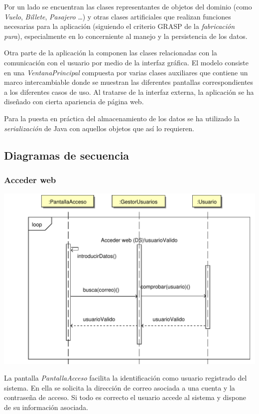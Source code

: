 \documentclass[11pt, a4paper, twoside, titlepage]{article}
\begin{document}
			Por un lado se encuentran las clases representantes de objetos del dominio (como \textit{Vuelo}, \textit{Billete}, \textit{Pasajero} \ldots) y otras clases artificiales que realizan funciones necesarias para la aplicación (siguiendo el criterio GRASP de la \textit{fabricación pura}), especialmente en lo concerniente al manejo y la persistencia de los datos.

			Otra parte de la aplicación la componen las clases relacionadas con la comunicación con el usuario por medio de la interfaz gráfica. El modelo consiste en una \textit{VentanaPrincipal} compuesta por varias clases auxiliares que contiene un marco intercambiable donde se muestran las diferentes pantallas correspondientes a los diferentes casos de uso. Al tratarse de la interfaz externa, la aplicación se ha diseñado con cierta apariencia de página web.

			Para la puesta en práctica del almacenamiento de los datos se ha utilizado la \textit{serialización} de Java con aquellos objetos que así lo requieren.

		\subsection{Diagramas de secuencia}
			\subsubsection{Acceder web}
				\begin{center}
					\includegraphics[scale=.7]{diseno/diagramas/accederweb.pdf}
				\end{center}

				La pantalla {\itshape PantallaAcceso} facilita la identificación como usuario registrado del sistema.
				En ella se solicita la dirección de correo asociada a una cuenta y la contraseña de acceso. Si todo es correcto el usuario accede al sistema y dispone de su información asociada.
\end{document}
